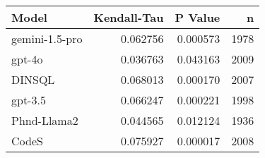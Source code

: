 \begin{tabular}{lrrr}
\toprule
Model & Kendall-Tau & P Value & n \\
\midrule
gemini-1.5-pro & 0.062756 & 0.000573 & 1978 \\
gpt-4o & 0.036763 & 0.043163 & 2009 \\
DINSQL & 0.068013 & 0.000170 & 2007 \\
gpt-3.5 & 0.066247 & 0.000221 & 1998 \\
Phnd-Llama2 & 0.044565 & 0.012124 & 1936 \\
CodeS & 0.075927 & 0.000017 & 2008 \\
\bottomrule
\end{tabular}

